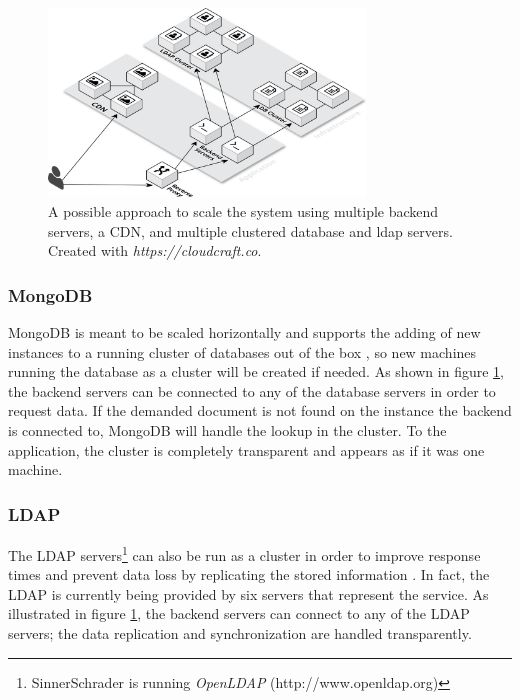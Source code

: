 \begin{figure}[!htp]
    \centering
    \includegraphics[width=0.75\textwidth]{images/system_architecture_scaled.png}
    \caption[Illustration: Scaled System Architecture]{A possible approach to scale the system using multiple backend servers, a CDN, and multiple clustered database and ldap servers. Created with \textit{https://cloudcraft.co}.}
    \label{scaleup}
\end{figure}

\newpage

\subsubsection{MongoDB}
MongoDB is meant to be scaled horizontally and supports the adding of new instances to a running cluster of databases out of the box \cite[p. 19]{MongoGuide}, so new machines running the database as a cluster will be created if needed. As shown in figure \ref{scaleup}, the backend servers can be connected to any of the database servers in order to request data. If the demanded document is not found on the instance the backend is connected to, MongoDB will handle the lookup in the cluster. To the application, the cluster is completely transparent and appears as if it was one machine.

\subsubsection{LDAP}
The LDAP servers\footnote{SinnerSchrader is running \textit{OpenLDAP} (http://www.openldap.org)} can also be run as a cluster in order to improve response times and prevent data loss by replicating the stored information \cite{ldapscale}. In fact, the LDAP is currently being provided by six servers that represent the service. As illustrated in figure \ref{scaleup}, the backend servers can connect to any of the LDAP servers; the data replication and synchronization are handled transparently.

